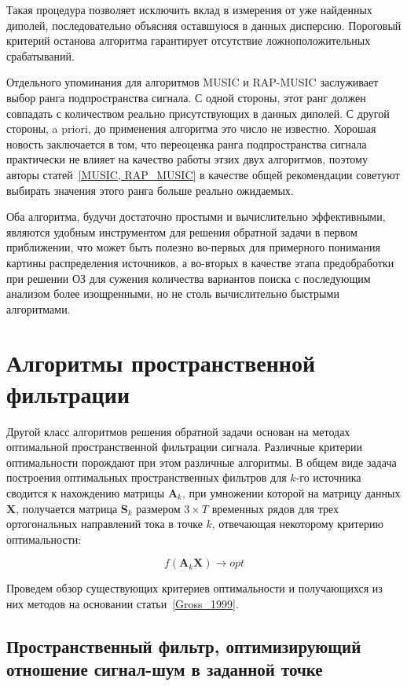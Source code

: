 Такая процедура позволяет исключить вклад в измерения от уже найденных
диполей, последовательно объясняя оставшуюся в данных дисперсию.
Пороговый критерий останова алгоритма гарантирует отсутствие ложноположительных
срабатываний.

Отдельного упоминания для алгоритмов MUSIC и RAP-MUSIC заслуживает выбор
ранга подпространства сигнала. С одной стороны, этот ранг должен совпадать
с количеством реально присутствующих в данных диполей. С другой стороны,
a priori, до применения алгоритма это число не известно. Хорошая новость заключается
в том, что переоценка ранга подпространства сигнала практически не влияет на
качество работы этзих двух алгоритмов,
поэтому авторы статей~\ref{MUSIC, RAP_MUSIC} в качестве общей рекомендации
советуют выбирать значения этого ранга больше реально ожидаемых.

Оба алгоритма, будучи достаточно простыми и вычислительно эффективными,
являются удобным инструментом для решения обратной задачи в первом приближении,
что может быть полезно во-первых для примерного понимания картины распределения
источников, а во-вторых в качестве этапа предобработки при решении ОЗ
для сужения количества вариантов поиска с последующим анализом более
изощренными, но не столь вычислительно быстрыми алгоритмами.

\section{Алгоритмы пространственной фильтрации}

Другой класс алгоритмов решения обратной задачи основан на методах оптимальной пространственной
фильтрации сигнала. Различные критерии оптимальности порождают при этом различные алгоритмы.
В общем виде задача построения оптимальных пространственных фильтров для $k$-го источника
сводится к нахождению
матрицы $\mathbf{A}_k$, при умножении которой на матрицу данных $\mathbf{X}$, получается
матрица $\mathbf{S}_k$ размером $3\times T$ временных рядов для трех ортогональных
направлений тока в точке $k$, отвечающая некоторому критерию оптимальности:

\begin{equation}
    f(\mathbf{A}_k \mathbf{X}) \rightarrow opt
\end{equation}

Проведем обзор существующих критериев оптимальности и получающихся из них методов на
основании статьи~\ref{Gross_1999}.

\subsection{Пространственный фильтр, оптимизирующий отношение сигнал-шум в заданной точке}

